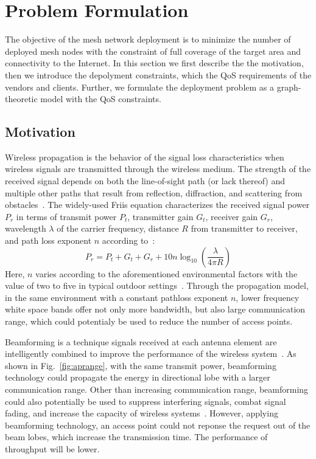 \section{Problem Formulation}
\label{sec:problemformulation}

The objective of the mesh network deployment is to minimize the number of 
deployed mesh nodes with the constraint of full coverage of the target area 
and connectivity to the Internet.  
In this section we first describe the the motivation, 
then we introduce the depolyment constraints, which
the QoS requirements of the vendors and clients.
Further, we formulate the deployment problem as a graph-theoretic model
with the QoS constraints. 

\subsection{Motivation}
\label{subsec:motivation}
Wireless propagation is the behavior of the signal loss characteristics 
when wireless signals are transmitted through the wireless medium.
The strength of the received signal depends on both the line-of-sight
path (or lack thereof) and multiple other paths that result from 
reflection, diffraction, and scattering from 
obstacles~\cite{andersen1995propagation}. The widely-used Friis
equation characterizes the received signal power $P_r$ in terms 
of transmit power $P_t$, transmitter gain $G_t$, receiver gain $G_r$, 
wavelength $\lambda$ of the carrier frequency, 
distance $R$ from transmitter to receiver, and path loss exponent 
$n$ according to~\cite{friis}:
\begin{equation}
\label{eq:friis}
P_r=P_t+G_t+G_r+10n \log_{10}\left( \frac{\lambda}{4\pi R}\right)
\end{equation}
Here, $n$ varies according to the aforementioned environmental 
factors with the value of two to five in typical outdoor 
settings~\cite{rappaport}. 
Through the propagation model, in the same environment with a 
constant pathloss exponent $n$, lower frequency white space 
bands offer not only more bandwidth, but also large communication
range, which could potentialy be used to reduce the number of 
access points.

Beamforming is a technique signals received at each antenna element are intelligently 
combined to improve the performance of the wireless system~\cite{winters2006smart}. 
As shown in Fig.~\ref{fig:aprange}, with the same transmit power, beamforming technology
could propagate the energy in directional lobe with a larger communication range.
Other than increasing communication range, beamforming could also potentially be used to 
suppress interfering signals, combat signal fading, and increase the capacity of 
wireless systems~\cite{bazan2012survey}. However, applying beamforming technology,
an access point could not reponse the request out of the beam lobes, which increase
the transmission time. The performance of throughput will be lower.

